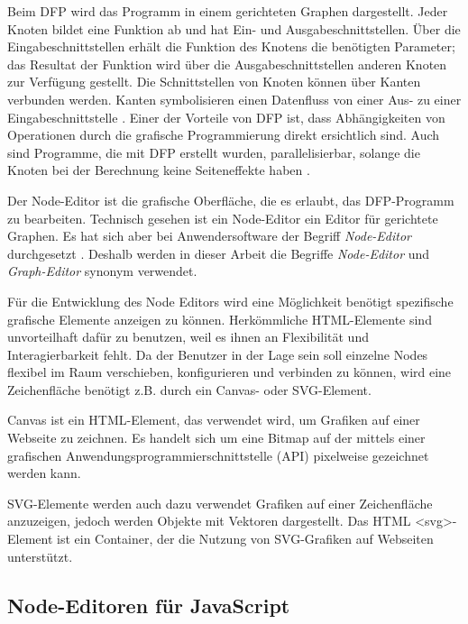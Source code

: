 Beim \ac{DFP} wird das Programm in einem gerichteten Graphen dargestellt. Jeder Knoten bildet eine Funktion ab und hat Ein- und Ausgabeschnittstellen. Über die Eingabeschnittstellen erhält die Funktion des Knotens die benötigten Parameter; das Resultat der Funktion wird über die Ausgabeschnittstellen anderen Knoten zur Verfügung gestellt. Die Schnittstellen von Knoten können über Kanten verbunden werden. Kanten symbolisieren einen Datenfluss von einer Aus- zu einer Eingabeschnittstelle \cite{dataflow}. Einer der Vorteile von \ac{DFP} ist, dass Abhängigkeiten von Operationen durch die grafische Programmierung direkt ersichtlich sind. Auch sind Programme, die mit \ac{DFP} erstellt wurden, parallelisierbar, solange die Knoten bei der Berechnung keine Seiteneffekte haben \cite{dataflow}.

Der Node-Editor ist die grafische Oberfläche, die es erlaubt, das \ac{DFP}-Programm zu bearbeiten. Technisch gesehen ist ein Node-Editor ein Editor für gerichtete Graphen. Es hat sich aber bei Anwendersoftware der Begriff \textit{Node-Editor} durchgesetzt \cite{nodeeditor:blender, nodeeditor:maya}. Deshalb werden in dieser Arbeit die Begriffe \textit{Node-Editor} und \textit{Graph-Editor} synonym verwendet.

Für die Entwicklung des Node Editors wird eine Möglichkeit benötigt spezifische grafische Elemente anzeigen zu können. Herkömmliche HTML-Elemente sind unvorteilhaft dafür zu benutzen, weil es ihnen an Flexibilität und Interagierbarkeit fehlt. Da der Benutzer in der Lage sein soll einzelne Nodes flexibel im Raum verschieben, konfigurieren und verbinden zu können, wird eine Zeichenfläche benötigt z.B. durch ein Canvas- oder SVG-Element.

Canvas ist ein HTML-Element, das verwendet wird, um Grafiken auf einer Webseite zu zeichnen. Es handelt sich um eine Bitmap auf der mittels einer grafischen Anwendungsprogrammierschnittstelle (API) pixelweise gezeichnet werden kann.

SVG-Elemente werden auch dazu verwendet Grafiken auf einer Zeichenfläche anzuzeigen, jedoch werden Objekte mit Vektoren dargestellt. Das HTML <svg>-Element ist ein Container, der die Nutzung von SVG-Grafiken auf Webseiten unterstützt.

\subsection{Node-Editoren für JavaScript}

